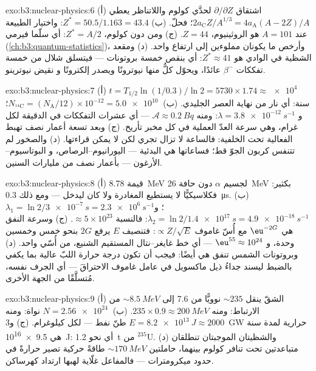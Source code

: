 \begin{solution}{exo:b3:nuclear-physics:6}
(أ) اشتقاق $\partial/\partial Z$ لحدَّي كولوم واللاتناظر
يعطي $2a_{\text{C}}Z/A^{1/3} = 4a_{\text{A}}(A - 2Z)/A$؛ فحلّ.
(ب) $Z^* = 50.5/1.163 = 43.4$: واختيار الطبيعة عند $A = 101$ هو
الروثينيوم، $Z = 44$. (ج) ومن دون كولوم، $Z^* = A/2$: أي سلّما
فيرمي (\cref{ch:b3:quantum-statistics})، وأرخص ما يكونان مملوءين إلى
ارتفاع واحد. (د) ومقعد الشظية في الوادي هو $Z^* \approx 41$:
أي بنقص خمسة بروتونات --- فيتسلق شلال من خمسة تفككات $\beta^-$
عائدًا، ويحوّل كلٌّ منها نيوترونًا ويصدر إلكترونًا و
نقيض نيوترينو.
\end{solution}

\begin{solution}{exo:b3:nuclear-physics:7}
(أ) $t = T_{1/2}\ln(1/0.3)/\ln2 = 5730\times1.74 \approx
\qty{e4}{}$ سنة: أي نار من نهاية العصر الجليدي. (ب) $N_{^{14}\text{C}}
= (N_{\text{A}}/12)\times10^{-12} = \qty{5.0e10}{}$؛ و $\lambda =
\qty{3.8e-12}{s^{-1}}$: ومنه $\mathcal A \approx \qty{0.2}{Bq}$ ---
أي عشرات التفككات في الدقيقة لكل غرام، وهي سرعة العدّ العملية في
كل مخبر تأريخ. (ج) وبعد تسعة أعمار نصف تهبط الفعالية
تحت الخلفية: فالساعة لا تزال تجري لكن لا يمكن
قراءتها. (د) والصخور لم تتنفس كربون الجوّ قط؛ فساعاتها
هي البدئية --- اليورانيوم--الرصاص، و
البوتاسيوم--الأرغون --- بأعمار نصف من مليارات السنين.
\end{solution}

\begin{solution}{exo:b3:nuclear-physics:8}
(أ) قيمة \qty{8.78}{MeV} لجسيم $\alpha$ دون حافة
\qty{26}{MeV} بكثير: فكلاسيكيًّا لا يستطيع المغادرة ولا كان
ليدخل --- ومع ذلك  \qty{0.3}{\micro s}. (ب)
$\lambda_1 = \ln2/\qty{3e-7}{s} = \qty{2.3e6}{s^{-1}}$؛ و
$\lambda_2 = \ln2/\qty{1.4e17}{s} = \qty{4.9e-18}{s^{-1}}$:
فالنسبة $\approx 5\times10^{23}$. (ج) وسرعة النفق هي
$\eu^{-2G}$ مع أُسّ غاموف $\propto Z/\sqrt E$:
فتنصيف $E$ يرفع $2G$ بنحو خمس وخمسين وحدة، و
$\eu^{55} \approx 10^{24}$ --- أي خط غايغر--نتال المستقيم
الشنيع، من أُسّي واحد. (د) وبروتونات الشمس تنفق
هي أيضًا: فيجب أن تكون درجة حرارة اللبّ عالية بما يكفي بالضبط ليسند
جداءُ ذيل ماكسويل في عامل غاموف الاحتراقَ ---
أي الجرف نفسه، مُتسلَّقًا من الجهة الأخرى.
\end{solution}

\begin{solution}{exo:b3:nuclear-physics:9}
(أ) الشقّ ينقل ${\sim}235$ نوويًّا من \qty{7.6}{} إلى
${\sim}\qty{8.5}{MeV}$ من الارتباط: ومنه $235\times0.9 \approx
\qty{200}{MeV}$. (ب) $N = \qty{2.56e24}{}$ نواة:
ومنه $E = \qty{8.2e13}{J} \approx 2000$ طنّ نفط --- لكل
كيلوغرام. (ج) و\qty{3}{GW} حرارية لمدة سنة هي
\qty{9.5e16}{J}: أي نحو \qty{1.2}{t} من $^{235}$U. (د) والشظيتان
الموجبتان تنطلقان متباعدتين تحت تنافر كولوم
بينهما، حاملتين ${\sim}\qty{170}{MeV}$ طاقةً حركية
تصير حرارةً في حدود ميكرومترات --- فالمفاعل غلّاية
لهبها ارتداد كهرساكن.
\end{solution}

